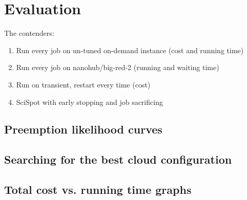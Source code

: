 \section{Evaluation}

The contenders:
\begin{enumerate}
\item Run every job on un-tuned on-demand instance (cost and running time)
\item Run every job on nanohub/big-red-2 (running and waiting time)
\item Run on transient, restart every time (cost)
\item SciSpot with early stopping and job sacrificing 
\end{enumerate}


\subsection{Preemption likelihood curves}

\subsection{Searching for the best cloud configuration}

\subsection{Total cost vs. running time graphs}



